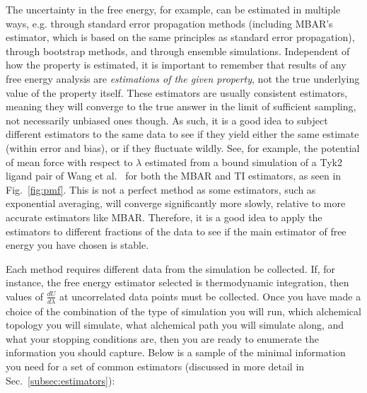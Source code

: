 The uncertainty in the free energy, for example, can be estimated in multiple ways, e.g. through standard error propagation methods (including MBAR's estimator, which is based on the same principles as standard error propagation), through bootstrap methods, and through ensemble simulations. 
Independent of how the property is estimated, it is important to remember that results of any free energy analysis are \textit{estimations of the given property}, not the true underlying value of the property itself. 
These estimators are usually consistent estimators, meaning they will converge to the true answer in the limit of sufficient sampling, not necessarily unbiased ones though.
As such, it is a good idea to subject different estimators to the same data to see if they yield either the same estimate (within error and bias), or if they fluctuate wildly. See, for example, the potential of mean force with respect to $\lambda$ estimated from a bound simulation of a Tyk2 ligand pair of Wang et al.~\cite{wang2015accurate} for both the MBAR and TI estimators, as seen in Fig.~\ref{fig:pmf}.
This is not a perfect method as some estimators, such as exponential averaging, will converge significantly more slowly, relative to more accurate estimators like MBAR. 
Therefore, it is a good idea to apply the estimators to different fractions of the data to see if the main estimator of free energy you have chosen is stable.

Each method requires different data from the simulation be collected. If, for instance, the free energy estimator selected is thermodynamic integration, then values of $\frac{dU}{d\lambda}$ at uncorrelated data points must be collected. Once you have made a choice of the combination of the type of simulation you will run, which alchemical topology you will simulate, what alchemical path you will simulate along, and what your stopping conditions are, then you are ready to enumerate the information you should capture. Below is a sample of the minimal information you need for a set of common estimators (discussed in more detail in Sec.~\ref{subsec:estimators}):


